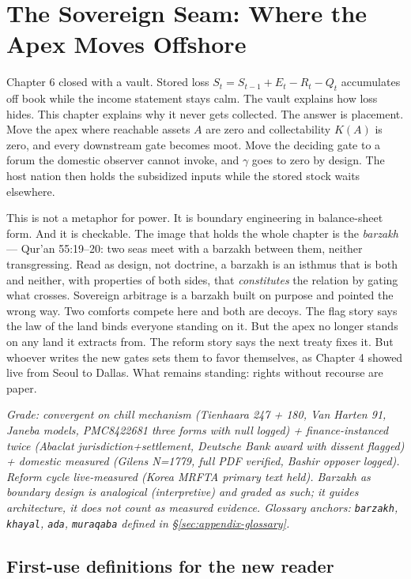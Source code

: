 \chapter{The Sovereign Seam: Where the Apex Moves Offshore}
\label{ch:sovereign}

Chapter 6 closed with a vault. Stored loss $S_t = S_{t-1} + E_t - R_t - Q_t$ accumulates off book while the income statement stays calm. The vault explains how loss hides. This chapter explains why it never gets collected. The answer is placement. Move the apex where reachable assets $A$ are zero and collectability $K(A)$ is zero, and every downstream gate becomes moot. Move the deciding gate to a forum the domestic observer cannot invoke, and $\gamma$ goes to zero by design. The host nation then holds the subsidized inputs while the stored stock waits elsewhere.

This is not a metaphor for power. It is boundary engineering in balance-sheet form. And it is checkable. The image that holds the whole chapter is the \textit{barzakh} --- Qur'an 55:19--20: two seas meet with a barzakh between them, neither transgressing. Read as design, not doctrine, a barzakh is an isthmus that is both and neither, with properties of both sides, that \textit{constitutes} the relation by gating what crosses. Sovereign arbitrage is a barzakh built on purpose and pointed the wrong way. Two comforts compete here and both are decoys. The flag story says the law of the land binds everyone standing on it. But the apex no longer stands on any land it extracts from. The reform story says the next treaty fixes it. But whoever writes the new gates sets them to favor themselves, as Chapter 4 showed live from Seoul to Dallas. What remains standing: rights without recourse are paper.

\textit{Grade: convergent on chill mechanism (Tienhaara 247 + 180, Van Harten 91, Janeba models, PMC8422681 three forms with null logged) + finance-instanced twice (Abaclat jurisdiction+settlement, Deutsche Bank award with dissent flagged) + domestic measured (Gilens N=1779, full PDF verified, Bashir opposer logged). Reform cycle live-measured (Korea MRFTA primary text held). Barzakh as boundary design is analogical (interpretive) and graded as such; it guides architecture, it does not count as measured evidence. Glossary anchors: \texttt{barzakh}, \texttt{khayal}, \texttt{ada}, \texttt{muraqaba} defined in \S\ref{sec:appendix-glossary}.}

\section{First-use definitions for the new reader}

